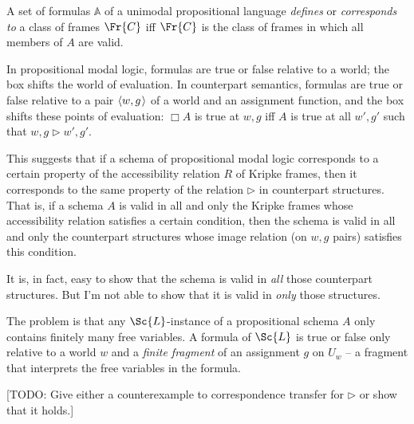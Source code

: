 \documentclass[11pt]{woarticle}
\theoremstyle{break}
\theoremstyle{nonumberplain}
\newcommand{\Img}{\triangleright}
\newcommand{\1}{\;\,|\;\,}
\renewcommand{\t}[1]{\ensuremath{\langle #1  \makebox[.2ex]{}\rangle}}
\begin{document}
\begin{definition}{\label{!FRAMECORR}}
  A set of formulas $\mathbb{A}$ of a unimodal propositional language
  \emph{defines} or \emph{corresponds to} a class of frames $\Fr{C}$ iff
  $\Fr{C}$ is the class of frames in which all members of $A$ are valid.
\end{definition}

In propositional modal logic, formulas are true or false relative to a world;
the box shifts the world of evaluation. In counterpart semantics, formulas are
true or false relative to a pair $\t{w,g}$ of a world and an assignment
function, and the box shifts these points of evaluation: $\Box A$ is true at
$w,g$ iff $A$ is true at all $w',g'$ such that $w,g \Img w',g'$.

This suggests that if a schema of propositional modal logic corresponds to a
certain property of the accessibility relation $R$ of Kripke frames, then it
corresponds to the same property of the relation $\Img$ in counterpart
structures. That is, if a schema $A$ is valid in all and only the Kripke frames
whose accessibility relation satisfies a certain condition, then the schema is
valid in all and only the counterpart structures whose image relation (on $w,g$
pairs) satisfies this condition.

It is, in fact, easy to show that the schema is valid in \emph{all} those
counterpart structures. But I'm not able to show that it is valid in \emph{only}
those structures.

The problem is that any $\Sc{L}$-instance of a propositional schema $A$ only
contains finitely many free variables. A formula of $\Sc{L}$ is true or false
only relative to a world $w$ and a \emph{finite fragment} of an assignment $g$
on $U_{w}$ -- a fragment that interprets the free variables in the formula.

[TODO: Give either a counterexample to correspondence transfer for $\Img$ or
show that it holds.]
\end{document}
